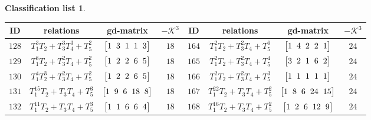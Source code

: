 \documentclass[pdftex]{sigma}%
\theoremstyle{definition}
\newtheorem{class-list}[thm]{Classification list}
\numberwithin{equation}{section}
\begin{document}
\begin{class-list}
\begin{table}[t!]\centering\setlength{\tabcolsep}{3.5pt}
\renewcommand{\arraystretch}{1.25}\small\tabulinesep=1mm
\begin{tabu}{c|c|c|c||c|c|c|c}
\hline
ID&relations&gd-matrix&$-\mathcal{K}^3$&ID&relations&gd-matrix&$-\mathcal{K}^3$
\\
\hline
${128}$&${T_{1}^{3}T_{2}+T_{3}^{3}T_{4}^{3}+T_{5}^{2}}$
&$\arraycolsep=1mm\begin{bmatrix}{1} & {3} & {1} & {1} & {3}\end{bmatrix}$&${18}$
&${164}$&${T_{1}^{2}T_{2}+T_{3}^{2}T_{4}+T_{5}^{6}}$
&$\arraycolsep=1mm\begin{bmatrix}{1} & {4} & {2} & {2} & {1}\end{bmatrix}$&${24}$
\\
\hline
${129}$&${T_{1}^{8}T_{2}+T_{3}^{2}T_{4}+T_{5}^{2}}$
&$\arraycolsep=1mm\begin{bmatrix}{1} & {2} & {2} & {6} & {5}\end{bmatrix}$&${18}$
&${165}$&${T_{1}^{2}T_{2}+T_{3}^{2}T_{4}+T_{5}^{4}}$
&$\arraycolsep=1mm\begin{bmatrix}{3} & {2} & {1} & {6} & {2}\end{bmatrix}$&${24}$
\\
\hline
${130}$&${T_{1}^{4}T_{2}^{3}+T_{3}^{2}T_{4}+T_{5}^{2}}$
&$\arraycolsep=1mm\begin{bmatrix}{1} & {2} & {2} & {6} & {5}\end{bmatrix}$&${18}$
&${166}$&${T_{1}^{2}T_{2}+T_{3}^{2}T_{4}+T_{5}^{3}}$
&$\arraycolsep=1mm\begin{bmatrix}{1} & {1} & {1} & {1} & {1}\end{bmatrix}$&${24}$
\\
\hline
${131}$&${T_{1}^{15}T_{2}+T_{3}T_{4}+T_{5}^{3}}$
&$\arraycolsep=1mm\begin{bmatrix}{1} & {9} & {6} & {18} & {8}\end{bmatrix}$&${18}$
&${167}$&${T_{1}^{22}T_{2}+T_{3}T_{4}+T_{5}^{2}}$
&$\arraycolsep=1mm\begin{bmatrix}{1} & {8} & {6} & {24} & {15}\end{bmatrix}$&${24}$
\\
\hline
${132}$&${T_{1}^{11}T_{2}+T_{3}T_{4}+T_{5}^{3}}$
&$\arraycolsep=1mm\begin{bmatrix}{1} & {1} & {6} & {6} & {4}\end{bmatrix}$&${18}$
&${168}$&${T_{1}^{16}T_{2}+T_{3}T_{4}+T_{5}^{2}}$
&$\arraycolsep=1mm\begin{bmatrix}{1} & {2} & {6} & {12} & {9}\end{bmatrix}$&${24}$

\end{tabu}
\end{table}
\end{class-list}
\end{document}

